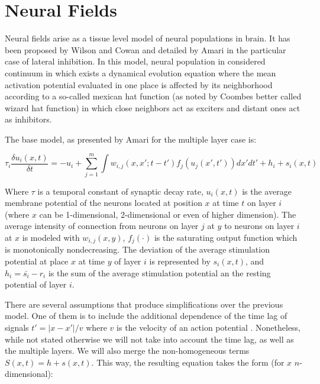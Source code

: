 \section{Neural Fields}
Neural fields arise as a tissue level model of neural populations in
brain. It has been proposed by Wilson and Cowan \cite{Wilson72Excitatory} and detailed
by Amari \cite{Amari77Dynamics} in the particular case of lateral inhibition. In
this model, neural population in considered continuum in which exists
a dynamical evolution equation where the mean activation potential
evaluated in one place is affected by its neighborhood according to a
so-called mexican hat function (as noted by Coombes \cite{Coombes05Waves} better
called wizard hat function) in which close neighbors act as exciters
and distant ones act as inhibitors.

The base model, as presented by Amari \cite{Amari77Dynamics} for the multiple
layer case is:

\begin{equation}
  \label{eq:nf-base}
  \tau_i\frac{\delta u_i(x,t)}{\delta
    t}=-u_i+\sum_{j=1}^{m}{\int{w_{i,j}(x,x';t-t')f_j\left(
    u_j(x',t')\right) dx' dt'}+h_i+s_i(x,t)}
\end{equation}

Where $\tau$ is a temporal constant of synaptic decay rate, $u_i(x,t)$
is the average membrane potential of the neurons located at position
$x$ at time $t$ on layer $i$ (where $x$ can be 1-dimensional, 2-dimensional or even
of higher dimension). The average intensity of connection from neurons
on layer $j$ at $y$ to neurons on layer $i$ at $x$ is modeled with
$w_{i,j}(x,y)$, $f_j(\cdot)$ is the saturating output function which is
monotonically nondecreasing. The deviation of the average stimulation
potential at place $x$ at time $y$ of layer $i$ is represented by
$s_i(x,t)$, and $h_i=\bar{s_i}-r_i$ is the sum of the average
stimulation potential an the resting potential of layer $i$. 


There are several assumptions that produce simplifications over the
previous model. One of them is to include the additional dependence of the time lag of
signals $t'=\lvert x-x'\rvert /v$ where $v$ is the velocity of an action
potential \cite{Wilson72Excitatory}. Nonetheless, while not stated
otherwise we will not take into account the time lag, as well as the multiple layers. We
will also merge the non-homogeneous terms $S(x,t)=h+s(x,t)$. This
way, the resulting equation takes the form (for $x$ $n$-dimensional):


